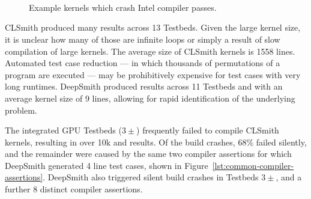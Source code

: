 \begin{figure}
  \centering
  \\%
  \\%
  \\%
  \\%
  \\%
  \\%
  \\%
  \\%
  \caption{Example kernels which crash Intel compiler passes.}%
  \label{lst:intel-passes}
\end{figure}

CLSmith produced many \bto results across 13 Testbeds. Given the large kernel
size, it is unclear how many of those are infinite loops or simply a result of
slow compilation of large kernels. The average size of CLSmith \bto kernels is
1558 lines. Automated test case reduction --- in which thousands of permutations
of a program are executed --- may be prohibitively expensive for test cases with
very long runtimes. DeepSmith produced \bto results across 11 Testbeds and with
an average kernel size of 9 lines, allowing for rapid identification of the
underlying problem.



The integrated GPU Testbeds ($3\pm$) frequently failed to compile CLSmith
kernels, resulting in over 10k \bc and \bto results. Of the build crashes, 68\%
failed silently, and the remainder were caused by the same two compiler
assertions for which DeepSmith generated 4 line test cases, shown in
Figure~\ref{lst:common-compiler-assertions}. DeepSmith also triggered silent build crashes
in Testbeds $3\pm$, and a further 8 distinct compiler assertions.

